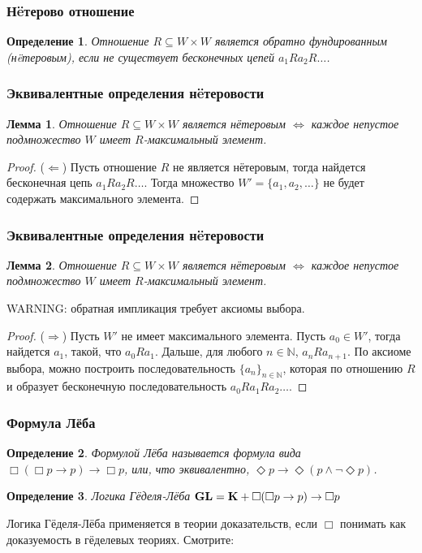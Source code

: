 \documentclass[pdf,utf8,russian,aspectratio=169]{beamer}
\newtheorem{defin}{Определение}
\newtheorem{lem}{Лемма}
\begin{document}
\begin{frame}
  \frametitle{Н\"{e}терово отношение}
\begin{defin}
  Отношение $R \subseteq W \times W$ является обратно фундированным (н\"{e}теровым), если не существует бесконечных цепей $a_1 R a_2 R \dots$.
\end{defin}
\end{frame}

\begin{frame}
  \frametitle{Эквивалентные определения н\"{e}теровости}
\begin{lem}
  Отношение $R \subseteq W \times W$ является н\"{е}теровым $\Leftrightarrow$ каждое непустое подмножество $W$ имеет $R$-максимальный элемент.
\end{lem}

\begin{proof}
  ($\Leftarrow$) Пусть отношение $R$ не является н\"{е}теровым, тогда найдется бесконечная цепь $a_1 R a_2 R \dots$. Тогда множество $W' = \{ a_1, a_2, \dots \}$
не будет содержать максимального элемента.
\end{proof}
\end{frame}

\begin{frame}
  \frametitle{Эквивалентные определения н\"{e}теровости}
\begin{lem}
  Отношение $R \subseteq W \times W$ является н\"{е}теровым $\Leftrightarrow$ каждое непустое подмножество $W$ имеет $R$-максимальный элемент.
\end{lem}

WARNING: обратная импликация требует аксиомы выбора.

\begin{proof}
  ($\Rightarrow$) Пусть $W'$ не имеет максимального элемента. Пусть $a_0 \in W'$, тогда найдется $a_1$, такой, что $a_0 R a_1$. Дальше, для любого $n \in \mathbb{N}$, $a_n R a_{n + 1}$. По аксиоме выбора, можно построить последовательность $\{ a_n \}_{n \in \mathbb{N}}$, которая по отношению $R$ и образует бесконечную последовательность $a_0 R a_1 R a_2 \dots$.
\end{proof}
\end{frame}

\begin{frame}
  \frametitle{Формула Л\"{е}ба}

  \begin{defin}
    Формулой Л\"{е}ба называется формула вида $\Box (\Box p \to p) \to \Box p$, или, что эквивалентно, $\Diamond p \to \Diamond (p \land \neg \Diamond p)$.
  \end{defin}

\begin{defin} Логика Г\"{е}деля-Л\"{е}ба
  ${\bf GL} = {\bf K} + \Box (\Box p \to p) \to \Box p$
\end{defin}

Логика Г\"{е}деля-Л\"{е}ба применяется в теории доказательств, если $\Box$ понимать как доказуемость в г\"{е}делевых теориях. Смотрите:

\end{frame}
\end{document}
